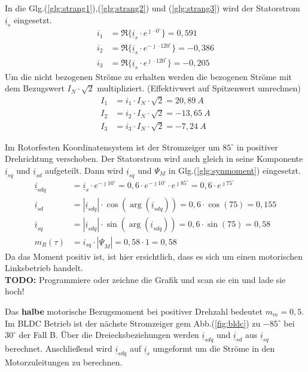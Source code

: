 \begin{solution}
\begin{compactenum}
\item In die Glg.(\ref{glg:strang1}),(\ref{glg:strang2}) und (\ref{glg:strang3}) wird der Statorstrom $\underline{i}_s$ eingesetzt.
\begin{align}
i_1 & = \Re \{ \underline{i}_s \cdot e^{\jmath \cdot 0 ^\circ} \} = 0,591\\
i_2 & = \Re \{ \underline{i}_s \cdot e^{-\jmath \cdot 120 ^\circ} \} = -0,386 \\
i_3 & = \Re \{ \underline{i}_s \cdot e^{\jmath \cdot 120 ^\circ} \}=  -0,205
\end{align}
Um die nicht bezogenen Ströme zu erhalten werden die bezogenen Ströme mit dem Bezugswert $I_N \cdot \sqrt{2}$ multipliziert. (Effektivwert auf Spitzenwert umrechnen)
\begin{align}
I_1 & = i_1 \cdot I_N \cdot \sqrt{2}  =20,89~A \\
I_2 & = i_2 \cdot I_N \cdot \sqrt{2} =-13,65~A \\
I_3 & = i_3 \cdot I_N \cdot \sqrt{2} =-7,24~A
\end{align}
\item Im Rotorfesten Koordinatensystem ist der Stromzeiger um $85^\circ$ in positiver Drehrichtung verschoben. Der Statorstrom wird auch gleich in seine Komponente $\underline{i}_{sq}$ und $\underline{i}_{sd}$ aufgeteilt. Dann wird $\underline{i}_{sq}$ und $\Psi_M$ in Glg.(\ref{glg:synmoment}) eingesetzt.
\begin{align}
\underline{i}_{sdq} & = \underline{i}_s \cdot e^{-\jmath 10 ^\circ} = 0,6 \cdot e^{-\jmath 10 ^\circ} \cdot e^{\jmath 85 ^\circ} = 0,6 \cdot e^{\jmath 75 ^\circ} \\
\underline{i}_{sd} & = |\underline{i}_{sdq}| \cdot \cos(\arg(\underline{i}_{sdq})) = 0,6 \cdot \cos(75) = 0,155 \\
\underline{i}_{sq} & = |\underline{i}_{sdq}| \cdot \sin(\arg(\underline{i}_{sdq})) = 0,6 \cdot \sin(75) = 0,58 \\
m_R(\tau)& =  i_{sq} \cdot | \underline{\Psi}_M|= 0,58\cdot 1 = 0,58
\end{align}
Da das Moment positiv ist, ist hier ersichtlich, dass es sich um einen motorischen Linksbetrieb handelt.\\
\textbf{TODO:} Programmiere oder zeichne die Grafik und scan sie ein und lade sie hoch!
\item Das \textbf{halbe} motorische Bezugsmoment bei positiver Drehzahl bedeutet $m_m = 0,5$. Im BLDC Betrieb ist der nächste Stromzeiger gem Abb.(\ref{fig:bldc}) zu $-85^\circ$ bei $30^\circ$ der Fall B. Über die Dreiecksbeziehungen werden $\underline{i}_{sdq}$ und $\underline{i}_{sd}$ aus $\underline{i}_{sq}$ berechnet. Anschließend wird $\underline{i}_{sdq}$ auf $\underline{i}_{s}$ umgeformt um die Ströme in den Motorzuleitungen zu berechnen.

\end{compactenum}
\end{solution}

